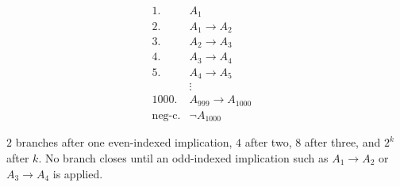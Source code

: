 \documentclass[border=8pt]{standalone}
\begin{document}
\begin{minipage}{0.96\textwidth}
\[
\begin{array}{rll}
1. & A_1 & \\
2. & A_1 \rightarrow A_2 & \\
3. & A_2 \rightarrow A_3 & \\
4. & A_3 \rightarrow A_4 & \\
5. & A_4 \rightarrow A_5 & \\
   & \vdots & \\
1000. & A_{999} \rightarrow A_{1000} & \\
\text{neg-c}. & \neg A_{1000} &
\end{array}
\]

\begin{center}

$2$ branches after one even-indexed implication, $4$ after two, $8$ after
three, and $2^k$ after $k$. No branch closes until an odd-indexed implication
such as $A_1\rightarrow A_2$ or $A_3\rightarrow A_4$ is applied.
\end{center}
\end{minipage}
\end{document}
